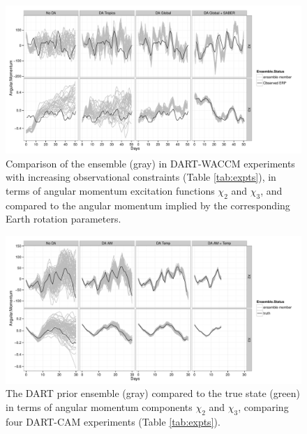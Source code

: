 \begin{figure}
	 \includegraphics[width=\textwidth]{Paper_figures/ERPDA_paper_evalvariable_aam_space.pdf}
	 \caption{Comparison of the ensemble (gray) in DART-WACCM experiments with increasing observational constraints (Table \ref{tab:expts}), in terms of angular momentum excitation functions $\chi_2$ and $\chi_3$, and compared to the angular momentum implied by the corresponding Earth rotation parameters.}
	 \label{fig:evalvariable_aam}
\end{figure}

\begin{figure}[p]
\includegraphics[width=\textwidth]{Paper_figures/ERPDA_paper_erpda_obs_space.pdf} 
\caption{ The DART prior ensemble (gray) compared to the true state (green) in terms of angular momentum components $\chi_2$ and $\chi_3$, comparing four DART-CAM experiments (Table \ref{tab:expts}).  }
 \label{fig:fit_to_ERPs}
\end{figure}

